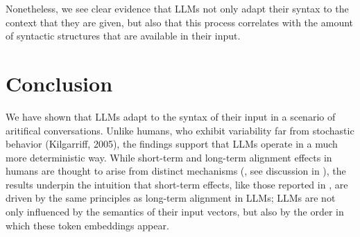 \documentclass[11pt]{article}
\begin{document}
Nonetheless, we see clear evidence that LLMs not only adapt their syntax to the context that they are given, but also that this process correlates with the amount of syntactic structures that are available in their input.

\section{Conclusion}
We have shown that LLMs adapt to the syntax of their input in a scenario of aritifical conversations. 
Unlike humans, who exhibit variability far from stochastic behavior (Kilgarriff, 2005), the findings support that LLMs operate in a much more deterministic way. While short-term and long-term alignment effects in humans are thought to arise from distinct mechanisms (\citealp{Reitter2014}, see discussion in \citealp{Rasenberg2020framework}), the results underpin the intuition that short-term effects, like those reported in \citealp{cai2024largelanguagemodelsresemble}, are driven by the same principles as long-term alignment in LLMs; LLMs are not only influenced by the semantics of their input vectors, but also by the order in which these token embeddings appear.
\end{document}
